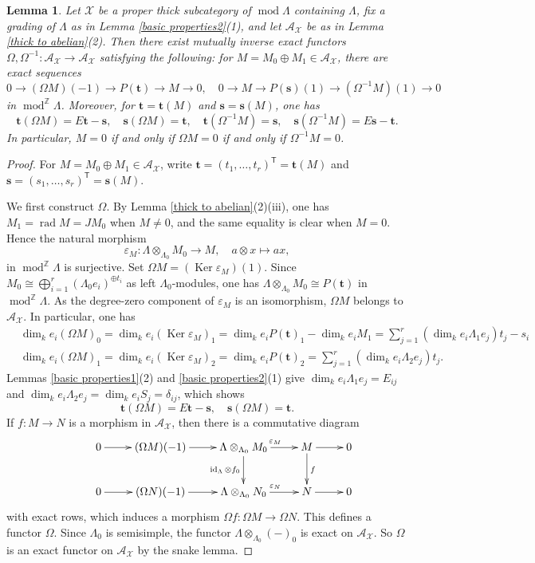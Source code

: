 \documentclass{amsart}
\newtheorem{lem}[thm]{Lemma}
\theoremstyle{definition}
\theoremstyle{remark}
\numberwithin{equation}{thm}
\def\A{\mathcal{A}}
\def\dim{\operatorname{dim}}
\def\gmod{\operatorname{mod}^{\mathbb{Z}}\!}
\def\id{\operatorname{id}}
\def\ker{\operatorname{Ker}}
\def\L{\Lambda}
\def\mod{\operatorname{mod}}
\def\rad{\operatorname{rad}}
\def\T{\mathsf{T}}
\def\X{\mathcal{X}}
\def\bfs{\mathbf{s}}
\def\bft{\mathbf{t}}
\begin{document}
\begin{lem}\label{syzygy functors}
Let $\X$ be a proper thick subcategory of $\mod\L$ containing $\L$, fix a grading of $\L$ as in Lemma \ref{basic properties2}(1), and let $\A_\X$ be as in Lemma \ref{thick to abelian}(2).
Then there exist mutually inverse exact functors $\Omega, \Omega^{-1}:\A_\X\to\A_\X$ satisfying the following:
for $M=M_0\oplus M_1\in\A_\X$, there are exact sequences
$$
0\to (\Omega M)(-1)\to P(\bft)\to M\to0,
\quad
0\to M\to P(\bfs)(1)\to (\Omega^{-1}M)(1)\to0
$$
in $\gmod\L$. Moreover, for $\bft=\bft(M)$ and $\bfs=\bfs(M)$, one has
$$
\bft(\Omega M)=E\bft-\bfs,\quad \bfs(\Omega M)=\bft,\quad \bft(\Omega^{-1}M)=\bfs,
\quad \bfs(\Omega^{-1}M)=E\bfs-\bft.
$$
In particular, $M=0$ if and only if $\Omega M=0$ if and only if $\Omega^{-1}M=0$.
\end{lem}
\begin{proof}
For $M=M_0\oplus M_1\in\A_\X$, write $\bft=(t_1,\ldots,t_r)^{\T}=\bft(M)$ and $\bfs=(s_1,\ldots,s_r)^{\T}=\bfs(M)$.

We first construct $\Omega$. By Lemma \ref{thick to abelian}(2)(iii), one has $M_1=\rad M=JM_0$ when $M\ne0$, and the same equality is clear when $M=0$. Hence the natural morphism
$$
\varepsilon_M:\L\otimes_{\L_0}M_0\to M,
\quad
a\otimes x\mapsto ax,
$$
in $\gmod\L$ is surjective. 
Set $\Omega M=(\ker\varepsilon_M)(1)$.
Since $M_0\cong\bigoplus_{i=1}^r(\L_0 e_i)^{\oplus t_i}$ as left $\L_0$-modules, 
one has $\L\otimes_{\L_0}M_0\cong P(\bft)$ in $\gmod \L$. 
As the degree-zero component of $\varepsilon_M$ is an isomorphism, $\Omega M$ belongs to $\A_\X$. In particular, one has
\begin{align*}
&\dim_k e_i(\Omega M)_0=\dim_k e_i(\ker\varepsilon_M)_1=\dim_k e_iP(\bft)_1-\dim_k e_i M_1=\sum_{j=1}^r(\dim_k e_i \L_1e_j)t_j-s_i \\
&\dim_k e_i(\Omega M)_1=\dim_k e_i(\ker\varepsilon_M)_2=\dim_k e_iP(\bft)_2=\sum_{j=1}^r(\dim_k e_i \L_2e_j)t_j.
\end{align*}
Lemmas \ref{basic properties1}(2) and \ref{basic properties2}(1) give $\dim_k e_i \L_1e_j=E_{ij}$ and $\dim_k e_i \L_2e_j=\dim_k e_i S_j=\delta_{ij}$, which shows
$$
\bft(\Omega M)=E\bft-\bfs,
\quad
\bfs(\Omega M)=\bft.
$$
If $f:M\to N$ is a morphism in $\A_\X$, then there is a commutative diagram
$$
\xymatrix{
&0\ar[r]&(\Omega M)(-1)\ar[r]&\L\otimes_{\L_0}M_0\ar[r]^{\varepsilon_M}\ar[d]_{\id_{\L}\otimes f_0}
&M\ar[d]^f\ar[r] &0\\
&0\ar[r]&(\Omega N)(-1)\ar[r]&\L\otimes_{\L_0}N_0\ar[r]^{\varepsilon_N}
&N\ar[r] &0
}
$$
with exact rows, which induces a morphism $\Omega f:\Omega M\to\Omega N$. This defines a functor $\Omega$.
Since $\L_0$ is semisimple, the functor $\L\otimes_{\L_0}(-)_0$ is exact on $\A_\X$. So $\Omega$ is an exact functor on $\A_\X$ by the snake lemma.


\end{proof}
\end{document}
